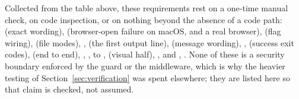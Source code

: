 Collected from the table above, these requirements rest on a one-time manual check, on
code inspection, or on nothing beyond the absence of a code path:  (exact
wording),  (browser-open failure on macOS, and a real browser),  (flag wiring), 
(file modes), ,  (the first output line),  (message
wording), ,  (success exit codes),  (end to end),
, ,  to ,  (visual half),
, and , .  None of these is a security boundary
enforced by the guard or the middleware, which is why the heavier testing of
Section~\ref{sec:verification} was spent elsewhere; they are listed here so that
claim is checked, not assumed.
